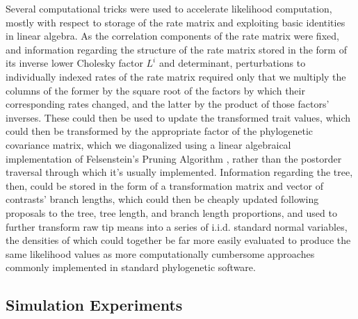 \documentclass[10pt, twocolumn, twoside]{article}
\begin{document}
Several computational tricks were used to accelerate likelihood computation, mostly with respect to storage of the rate matrix and exploiting basic identities in linear algebra. As the correlation components of the rate matrix were fixed, and information regarding the structure of the rate matrix stored in the form of its inverse lower Cholesky factor $L^i$ and determinant, perturbations to individually indexed rates of the rate matrix required only that we multiply the columns of the former by the square root of the factors by which their corresponding rates changed, and the latter by the product of those factors' inverses. These could then be used to update the transformed trait values, which could then be transformed by the appropriate factor of the phylogenetic covariance matrix, which we diagonalized using a linear algebraical implementation of Felsenstein's Pruning Algorithm \citep{felsensteinMaximumlikelihoodEstimationEvolutionary1973}, rather than the postorder traversal through which it's usually implemented. Information regarding the tree, then, could be stored in the form of a transformation matrix and vector of contrasts' branch lengths, which could then be cheaply updated following proposals to the tree, tree length, and branch length proportions, and used to further transform raw tip means into a series of i.i.d. standard normal variables, the densities of which could together be far more easily evaluated to produce the same likelihood values as more computationally cumbersome approaches commonly implemented in standard phylogenetic software.

\subsection{Simulation Experiments}
\end{document}
